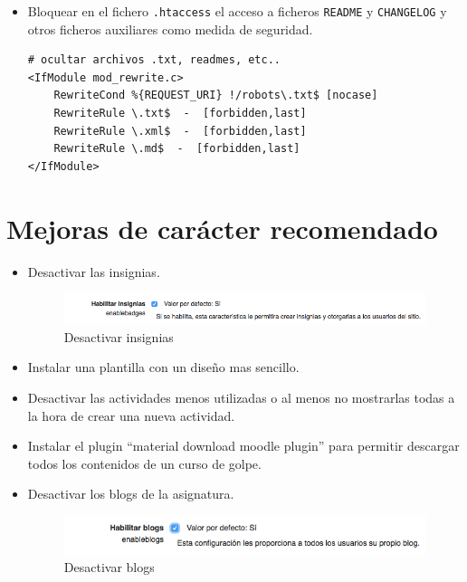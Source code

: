 \begin{itemize}
	\item Bloquear en el fichero \texttt{.htaccess} el acceso a ficheros \texttt{README} y \texttt{CHANGELOG} y otros ficheros auxiliares como medida de seguridad.
\begin{lstlisting}
# ocultar archivos .txt, readmes, etc..
<IfModule mod_rewrite.c>
    RewriteCond %{REQUEST_URI} !/robots\.txt$ [nocase]
    RewriteRule \.txt$  -  [forbidden,last]
    RewriteRule \.xml$  -  [forbidden,last]
    RewriteRule \.md$  -  [forbidden,last]
</IfModule>
\end{lstlisting}


\end{itemize}


\section{Mejoras de carácter recomendado}

\begin{itemize}
	\item Desactivar las insignias.
\begin{figure}[H]
\centering
\includegraphics[width=1.0\textwidth]{../screenshots/desactivar_insignias}
\caption{Desactivar insignias}
\end{figure}
	\item Instalar una plantilla con un diseño mas sencillo.
	\item Desactivar las actividades menos utilizadas o al menos no mostrarlas todas a la hora de crear una nueva actividad.
	\item Instalar el plugin ``material download moodle plugin''\cite{moodleplugin} para permitir descargar todos los contenidos de un curso de golpe.
	\item Desactivar los blogs de la asignatura.
\begin{figure}[H]
\centering
\includegraphics[width=1.0\textwidth]{../screenshots/desactivar_blogs}
\caption{Desactivar blogs}
\end{figure}
\end{itemize}

